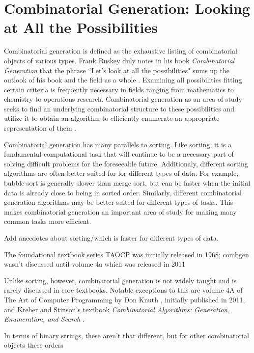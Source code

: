 
\section{Combinatorial Generation: Looking at All the Possibilities}

Combinatorial generation is defined as the exhaustive listing of combinatorial objects of various types.  Frank Ruskey duly notes in his book \emph{Combinatorial Generation} that the phrase ``Let's look at all the possibilities" sums up the outlook of his book and the field as a whole \cite{ruskey2003combinatorial}. Examining all possibilities fitting certain criteria is frequently necessary in fields ranging from mathematics to chemistry to operations research. Combinatorial generation as an area of study seeks to find an underlying combinatorial structure to these possibilities and utilize it to obtain an algorithm to efficiently enumerate an appropriate representation of them \cite{ruskey2003combinatorial}. 

Combinatorial generation has many parallels to sorting.  Like sorting, it is a fundamental computational task that will continue to be a necessary part of solving difficult problems for the foreseeable future.  Additionaly, different sorting algorithms are often better suited for for different types of data.  For example, bubble sort is generally slower than merge sort, but can be faster when the initial data is already close to being in sorted order. Similarly, different combinatorial generation algorithms may be better suited for different types of tasks.  This makes combinatorial generation an important area of study for making many common tasks more efficient.  

Add anecdotes about sorting/which is faster for different types of data. 

The foundational textbook series TAOCP was initially released in 1968; combgen wasn't discussed until volume 4a which was released in 2011

Unlike sorting, however, combinatorial generation is not widely taught and is rarely discussed in core textbooks. Notable exceptions to this are volume 4A of The Art of Computer Programming by Don Knuth \cite{knuth2015art}, initially published in 2011, and Kreher and Stinson's textbook \emph{Combinatorial Algorithms: Generation, Enumeration, and Search} \cite{kreher2020combinatorial}.

In terms of binary strings, these aren't that different, but for other combinatorial objects these orders

